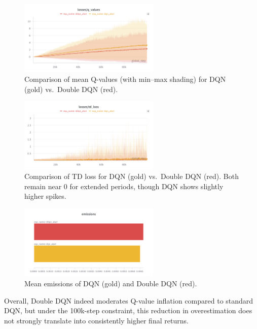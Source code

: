 \begin{figure}
	\centering
	\includegraphics[width=0.6\textwidth]{figures/ddqn/png/comparison_losses_q_values_dqn_ddqn.png}
	\caption{Comparison of mean Q-values (with min--max shading) for DQN (gold) vs.\ Double DQN (red).}
	\label{fig:dqn_vs_ddqn_qvalues}
\end{figure}

\begin{figure}
	\centering
	\includegraphics[width=0.6\textwidth]{figures/ddqn/png/comparison_losses_td_loss_dqn_ddqn.png}
	\caption{Comparison of TD loss for DQN (gold) vs.\ Double DQN (red). 
		Both remain near 0 for extended periods, though DQN shows slightly higher spikes.}
	\label{fig:dqn_vs_ddqn_td_loss}
\end{figure}


\begin{figure}
	\centering
	\includegraphics[width=0.6\textwidth]{figures/ddqn/png/emissions_dqn_ddqn.png}
	\caption{Mean emissions of DQN (gold) and Double DQN (red).}
	\label{fig:emissions_dqn_ddqn}
\end{figure}

Overall, Double DQN indeed moderates Q-value inflation compared to standard DQN, 
but under the 100k-step constraint, this reduction in overestimation does not strongly translate 
into consistently higher final returns.

